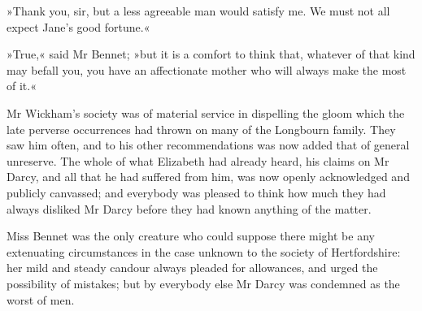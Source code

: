 »Thank you, sir, but a less agreeable man would satisfy me. We must not all expect Jane's good fortune.«

»True,« said Mr Bennet; »but it is a comfort to think that, whatever of that kind may befall you, you have an affectionate mother who will always make the most of it.«

Mr Wickham's society was of material service in dispelling the gloom which the late perverse occurrences had thrown on many of the Longbourn family. They saw him often, and to his other recommendations was now added that of general unreserve. The whole of what Elizabeth had already heard, his claims on Mr Darcy, and all that he had suffered from him, was now openly acknowledged and publicly canvassed; and everybody was pleased to think how much they had always disliked Mr Darcy before they had known anything of the matter.

Miss Bennet was the only creature who could suppose there might be any extenuating circumstances in the case unknown to the society of Hertfordshire: her mild and steady candour always pleaded for allowances, and urged the possibility of mistakes; but by everybody else Mr Darcy was condemned as the worst of men.